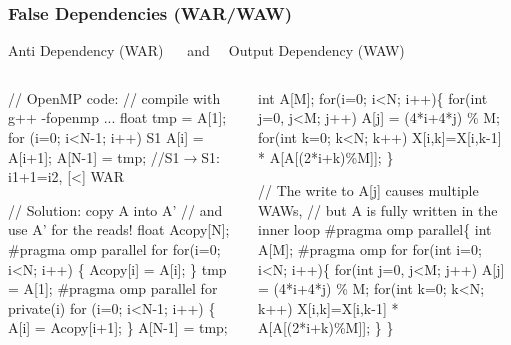 \documentclass{beamer}
\renewcommand{\emph}[1]{\textcolor{structure}{#1}}
\newcommand{\emp}[1]{\textcolor{DikuRed}{ #1}}
\newcommand{\mymath}[1]{$ #1 $}
\begin{document}
\begin{frame}[fragile,t]
  \frametitle{False Dependencies (WAR/WAW)} 

\begin{block}{Anti Dependency (WAR) {\tt~~} and {\tt~~}Output Dependency (WAW)}
\begin{columns}
\begin{colorcode}[fontsize=\scriptsize]
// \alert{OpenMP code:} 
// \alert{compile with g++ -fopenmp ...}
  float tmp = A[1];
  \emp{for (i=0; i<N-1; i++)}
\emp{S1  A[i] = A[i+1];} 
  A[N-1] = tmp;
//S1\mymath{\rightarrow}S1: i1+1=i2, \emp{[<]} WAR\pause

// Solution: copy A into A'
// and use A' for the reads!
float Acopy[N];
\#pragma omp parallel for
  \emph{for(i=0; i<N; i++)} \{
    Acopy[i] = A[i];
  \}
  tmp = A[1];
\emph{\#pragma omp parallel for} \emp{private(i)}
  for (i=0; i<N-1; i++) \{
    \emph{A[i] = Acopy[i+1];}
  \}
  A[N-1] = tmp;
\end{colorcode}

\begin{colorcode}[fontsize=\scriptsize]
  int A[M];
  for(i=0; i<N; i++)\{
    for(int j=0, j<M; j++)
        \emp{A[j]} = (4*i+4*j) \% M;
    for(int k=0; k<N; k++)
        X[i,k]=X[i,k-1] * \emp{A[A[(2*i+k)\%M]]};
  \}

// \emp{The write to A[j] causes multiple WAWs},\pause
// \emph{but A is fully written in the inner loop} 
\emph{\#pragma omp parallel}\{
  int A[M];
\emph{\#pragma omp for}
  for(int i=0; i<N; i++)\{
    for(int j=0, j<M; j++)
        \emp{A[j]} = (4*i+4*j) \% M;
    for(int k=0; k<N; k++)
        X[i,k]=X[i,k-1] * \emp{A[A[(2*i+k)\%M]]};
  \}
\}
\end{colorcode}
\end{columns}
\end{block}


\end{frame}
\end{document}

